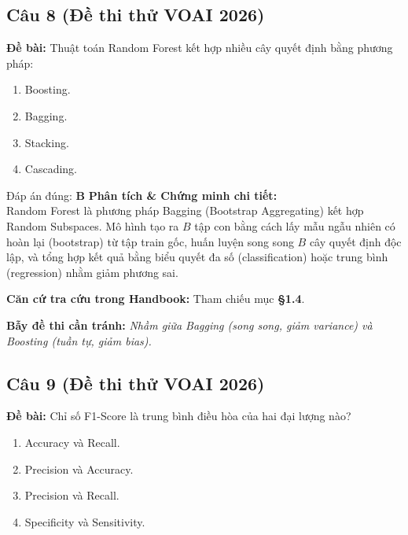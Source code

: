 \documentclass[10pt,a4paper]{article}
\begin{document}
\subsection*{Câu 8 (Đề thi thử VOAI 2026)}
\textbf{Đề bài:} Thuật toán Random Forest kết hợp nhiều cây quyết định bằng phương pháp:

\begin{enumerate}[label=\textbf{\Alph*.}]
    \item Boosting.
    \item Bagging.
    \item Stacking.
    \item Cascading.
\end{enumerate}

\begin{solbox}{Đáp án đúng: \textbf{B}}
\textbf{Phân tích \& Chứng minh chi tiết:} \\
Random Forest là phương pháp Bagging (Bootstrap Aggregating) kết hợp Random Subspaces. Mô hình tạo ra $B$ tập con bằng cách lấy mẫu ngẫu nhiên có hoàn lại (bootstrap) từ tập train gốc, huấn luyện song song $B$ cây quyết định độc lập, và tổng hợp kết quả bằng biểu quyết đa số (classification) hoặc trung bình (regression) nhằm giảm phương sai.

\vspace{0.4em}
\textbf{Căn cứ tra cứu trong Handbook:} Tham chiếu mục \textbf{§1.4}.

\vspace{0.4em}
\textbf{Bẫy đề thi cần tránh:} \textit{Nhầm giữa Bagging (song song, giảm variance) và Boosting (tuần tự, giảm bias).}
\end{solbox}
\vspace{0.5em}


\subsection*{Câu 9 (Đề thi thử VOAI 2026)}
\textbf{Đề bài:} Chỉ số F1-Score là trung bình điều hòa của hai đại lượng nào?

\begin{enumerate}[label=\textbf{\Alph*.}]
    \item Accuracy và Recall.
    \item Precision và Accuracy.
    \item Precision và Recall.
    \item Specificity và Sensitivity.
\end{enumerate}
\end{document}
